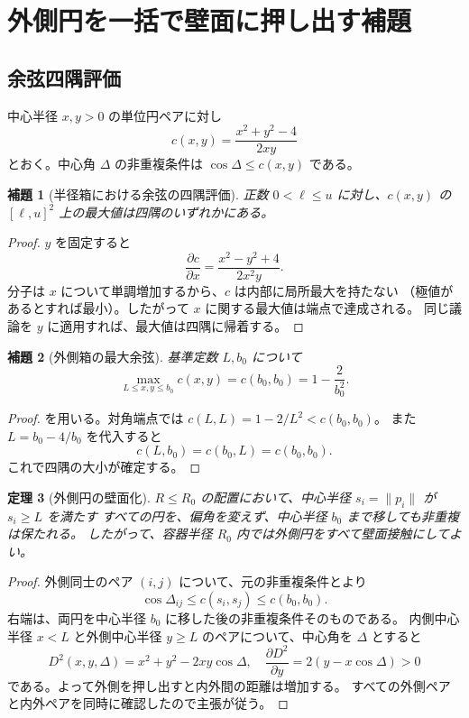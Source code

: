 \documentclass[11pt,a4paper]{article}
\theoremstyle{JPthm}
\newtheorem{theorem}{定理}[section]
\newtheorem{lemma}[theorem]{補題}
\theoremstyle{definition}
\newcommand{\Rc}{R_{0}}
\newcommand{\bzero}{b_{0}}
\begin{document}
\section{外側円を一括で壁面に押し出す補題}
\subsection{余弦四隅評価}
中心半径 $x,y>0$ の単位円ペアに対し
\begin{equation}\label{eq:cxy}
 c(x,y)=\frac{x^2+y^2-4}{2xy}
\end{equation}
とおく。中心角 $\Delta$ の非重複条件は $\cos\Delta\le c(x,y)$ である。
\begin{lemma}[半径箱における余弦の四隅評価]\label{lem:corner}
正数 $0<\ell\le u$ に対し、$c(x,y)$ の $[\ell,u]^2$ 上の最大値は四隅のいずれかにある。
\end{lemma}
\begin{proof}
$y$ を固定すると
\[
 \frac{\partial c}{\partial x}=\frac{x^2-y^2+4}{2x^2y}.
\]
分子は $x$ について単調増加するから、$c$ は内部に局所最大を持たない
（極値があるとすれば最小）。したがって $x$ に関する最大値は端点で達成される。
同じ議論を $y$ に適用すれば、最大値は四隅に帰着する。
\end{proof}
\begin{lemma}[外側箱の最大余弦]\label{lem:wallcos}
基準定数 $L,\bzero$ について
\begin{equation}\label{eq:boxbound}
\max_{L\le x,y\le\bzero}c(x,y)=c(\bzero,\bzero)=1-\frac2{\bzero^2}.
\end{equation}
\end{lemma}
\begin{proof}
を用いる。対角端点では
$c(L,L)=1-2/L^2<c(\bzero,\bzero)$。
また $L=\bzero-4/\bzero$ を代入すると
\[
 c(L,\bzero)=c(\bzero,L)=c(\bzero,\bzero).
\]
これで四隅の大小が確定する。
\end{proof}
\begin{theorem}[外側円の壁面化]\label{thm:radialpush}
$R\le\Rc$ の配置において、中心半径 $s_i=\|p_i\|$ が $s_i\ge L$ を満たす
すべての円を、偏角を変えず、中心半径 $\bzero$ まで移しても非重複は保たれる。
したがって、容器半径 $\Rc$ 内では外側円をすべて壁面接触にしてよい。
\end{theorem}
\begin{proof}
外側同士のペア $(i,j)$ について、元の非重複条件とより
\[
\cos\Delta_{ij}\le c(s_i,s_j)\le c(\bzero,\bzero).
\]
右端は、両円を中心半径 $\bzero$ に移した後の非重複条件そのものである。
内側中心半径 $x<L$ と外側中心半径 $y\ge L$ のペアについて、中心角を $\Delta$ とすると
\[
D^2(x,y,\Delta)=x^2+y^2-2xy\cos\Delta,
\quad
\frac{\partial D^2}{\partial y}=2(y-x\cos\Delta)>0
\]
である。よって外側を押し出すと内外間の距離は増加する。
すべての外側ペアと内外ペアを同時に確認したので主張が従う。
\end{proof}
\end{document}
